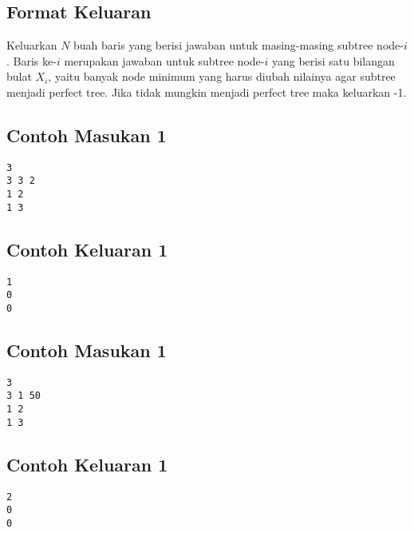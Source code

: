 \documentclass{article}
\begin{document}
\subsection*{Format Keluaran}

Keluarkan $N$ buah baris yang berisi jawaban untuk masing-masing subtree node-$i$. Baris ke-$i$ merupakan jawaban untuk subtree node-$i$ yang berisi satu bilangan bulat $X_i$, yaitu banyak node minimum yang harus diubah nilainya agar subtree menjadi perfect tree. Jika tidak mungkin menjadi perfect tree maka keluarkan -1.
\\

\begin{multicols}{2}
\subsection*{Contoh Masukan 1}
\begin{lstlisting}
3
3 3 2
1 2
1 3

\end{lstlisting}
\columnbreak
\subsection*{Contoh Keluaran 1}
\begin{lstlisting}
1
0
0
\end{lstlisting}
\vfill
\null
\end{multicols}

\begin{multicols}{2}
\subsection*{Contoh Masukan 1}
\begin{lstlisting}
3
3 1 50
1 2
1 3

\end{lstlisting}
\columnbreak
\subsection*{Contoh Keluaran 1}
\begin{lstlisting}
2
0
0
\end{lstlisting}
\vfill
\null
\end{multicols}


\pagebreak
\end{document}

